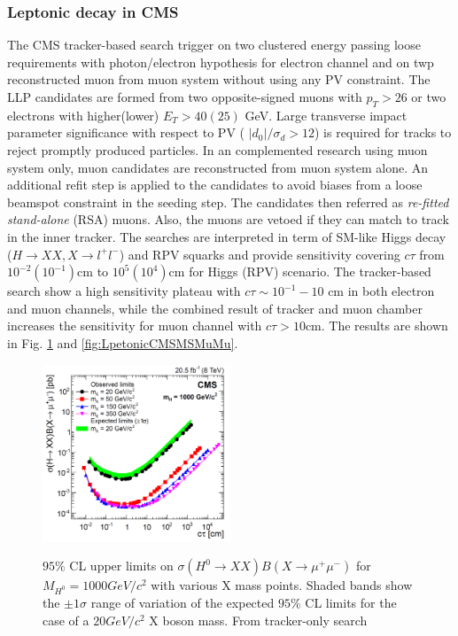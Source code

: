 \subsubsection{Leptonic decay in CMS}
The CMS tracker-based search trigger on two clustered energy passing loose requirements with photon/electron hypothesis for electron channel and on twp reconstructed muon from muon system without using any PV constraint. The LLP candidates are formed from two opposite-signed muons with $p_T > 26$ or two electrons with higher(lower) $E_T> 40(25)$ GeV. Large transverse impact parameter significance with respect to  PV ( $|d_0|/\sigma_d > 12$) is required for tracks to reject promptly produced particles.  In an complemented research using muon system only, muon candidates are reconstructed from muon system alone. An additional refit step is applied to  the candidates to avoid biases from  a loose beamspot constraint in the seeding step. The candidates then referred as \textit{re-fitted stand-alone} (RSA) muons. Also, the muons are vetoed if they can match to track in the inner tracker. The searches are interpreted in term of SM-like Higgs decay ($H\rightarrow XX, X\rightarrow l^+ l^-$) and RPV squarks and provide sensitivity covering $c\tau$ from $ 10^{-2} (10^{-1})$cm to $ 10^{5} (10^{4})$cm for Higgs (RPV) scenario. The tracker-based search show a high sensitivity plateau with $c\tau \sim 10^{-1}-10$ cm in both electron and muon channels, while the combined result of tracker and muon chamber increases the sensitivity for muon channel with $c\tau > 10$cm. The results are shown in Fig. \ref{fig:LpetonicCMStrackerMuMu} and \ref{fig:LpetonicCMSMSMuMu}.

\begin{figure}
    \centering
    \caption{$95\%$ CL upper limits on $\sigma(H^0\rightarrow XX)B(X \rightarrow \mu^{+} \mu^{−} )$ for $M_{H^0} = 1000 GeV/c^2$ with various X mass points. Shaded bands show the $\pm 1\sigma$ range of variation of the expected $95\%$ CL limits for the case of a $20 GeV/c^2$ X boson mass. From tracker-only search \cite{CMSDiLepton2015}}
    \includegraphics[width=0.5\textwidth]{fig/LpetonicCMStrackerMuMu.png}
    \label{fig:LpetonicCMStrackerMuMu}
\end{figure}

